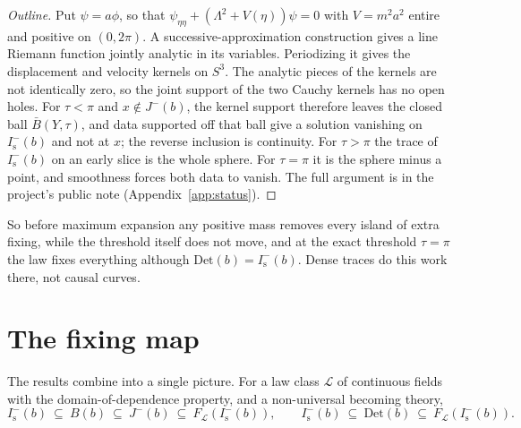 \documentclass[11pt]{article}
\theoremstyle{definition}
\newcommand{\Jm}{J^{-}}
\newcommand{\Is}{I^-_{\mathrm s}}
\newcommand{\Det}{\mathrm{Det}}
\begin{document}
\begin{proof}[Outline]
Put $\psi=a\phi$, so that $\psi_{\eta\eta}+(\Lambda^2+V(\eta))\psi=0$ with $V=m^2a^2$ entire and positive
on $(0,2\pi)$. A successive-approximation construction gives a line Riemann function jointly
analytic in its variables. Periodizing it gives the displacement and velocity kernels on
$S^3$. The analytic pieces of the kernels are not identically zero, so the joint support of
the two Cauchy kernels has no open holes. For $\tau<\pi$ and $x\notin\Jm(b)$, the kernel
support therefore leaves the closed ball $\bar B(Y,\tau)$, and data supported off that ball
give a solution vanishing on $\Is(b)$ and not at $x$; the reverse inclusion is continuity.
For $\tau>\pi$ the trace of $\Is(b)$ on an early slice is the whole sphere. For $\tau=\pi$ it is
the sphere minus a point, and smoothness forces both data to vanish.
The full argument is in the project's public note (Appendix~\ref{app:status}).
\end{proof}

So before maximum expansion any positive mass removes every island of extra fixing, while
the threshold itself does not move, and at the exact threshold $\tau=\pi$ the law fixes
everything although $\Det(b)=\Is(b)$. Dense traces do this work there, not causal curves.



\section{The fixing map}\label{sec:map}

The results combine into a single picture. For a law class $\mathcal L$ of continuous fields
with the domain-of-dependence property, and a non-universal becoming theory,
\begin{equation}\label{eq:chain}
\Is(b)\ \subseteq\ B(b)\ \subseteq\ \Jm(b)\ \subseteq\ F_{\mathcal L}(\Is(b)),
\qquad \Is(b)\ \subseteq\ \Det(b)\ \subseteq\ F_{\mathcal L}(\Is(b)).
\end{equation}
\end{document}
